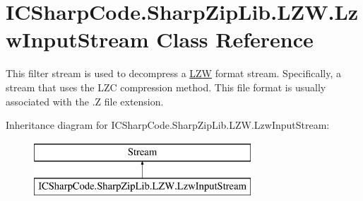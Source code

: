\hypertarget{class_i_c_sharp_code_1_1_sharp_zip_lib_1_1_l_z_w_1_1_lzw_input_stream}{}\section{I\+C\+Sharp\+Code.\+Sharp\+Zip\+Lib.\+L\+Z\+W.\+Lzw\+Input\+Stream Class Reference}
\label{class_i_c_sharp_code_1_1_sharp_zip_lib_1_1_l_z_w_1_1_lzw_input_stream}


This filter stream is used to decompress a \hyperlink{namespace_i_c_sharp_code_1_1_sharp_zip_lib_1_1_l_z_w}{L\+ZW} format stream. Specifically, a stream that uses the L\+ZC compression method. This file format is usually associated with the .Z file extension.  


Inheritance diagram for I\+C\+Sharp\+Code.\+Sharp\+Zip\+Lib.\+L\+Z\+W.\+Lzw\+Input\+Stream\+:\begin{figure}[H]
\begin{center}
\leavevmode
\includegraphics[height=2.000000cm]{class_i_c_sharp_code_1_1_sharp_zip_lib_1_1_l_z_w_1_1_lzw_input_stream}
\end{center}
\end{figure}

